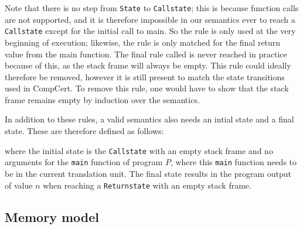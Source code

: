 Note that there is no step from \texttt{State} to \texttt{Callstate}; this is
because function calls are not supported, and it is therefore impossible in our
semantics ever to reach a \texttt{Callstate} except for the initial call to
main. So the  rule is only used at the very beginning
of execution; likewise, the  rule is only matched for
the final return value from the main function.  The final rule called
 is never reached in practice because of this, as the
stack frame will always be empty.  This rule could ideally therefore be removed,
however it is still present to match the state transitions used in CompCert.  To
remove this rule, one would have to show that the stack frame remains empty by
induction over the semantics.

In addition to these rules, a valid semantics also needs an intial state and a
final state.  These are therefore defined as follows:
%

\noindent where the initial state is the \texttt{Callstate} with an empty stack
frame and no arguments for the \texttt{main} function of program $P$, where this
\texttt{main} function needs to be in the current translation unit.  The final
state results in the program output of value $n$ when reaching a
\texttt{Returnstate} with an empty stack frame.

\subsection{Memory model}\label{sec:verilog:memory}

